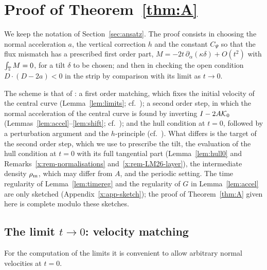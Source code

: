 \section{Proof of Theorem~\ref{thm:A}}\label{sec:proof}

We keep the notation of Section~\ref{sec:ansatz}. The proof consists in choosing the normal acceleration $a$, the vertical correction $h$ and the constant $C_\Psi$ so that the flux mismatch
has a prescribed first order part, $M=-2t\,\partial_\alpha(\kappa\delta)+O(t^2)$ with $\int_{\mathbb{T}} M=0$, for a tilt $\delta$ to be chosen; and then in checking the open condition $D\cdot(D-2a)<0$ in
the strip by comparison with its limit as $t\to0$.

The scheme is that of \cite[Secs.~5--7]{LM26}: a first order matching, which fixes the initial velocity of the central curve (Lemma~\ref{lem:limits}; cf.\ \cite[Lemmas~5.1--5.2]{LM26}); a second
order step, in which the normal acceleration of the central curve is found by inverting $I-2A\mathcal{K}_0$ (Lemmas~\ref{lem:accel}--\ref{lem:shift}; cf.\ \cite[Lemma~5.3 and Prop.~6.1]{LM26}); and
the hull condition at $t=0$, followed by a perturbation argument and the $h$-principle (cf.\ \cite[Sec.~7.4]{LM26}). What differs is the target of the second order step, which we use to prescribe
the tilt, the evaluation of the hull condition at $t=0$ with its full tangential part (Lemma~\ref{lem:hull0} and Remarks~\ref{x:rem-normalisations} and~\ref{x:rem-LM26-layer}), the
intermediate density $\rho_{\mathrm m}$, which may differ from $A$, and the periodic setting. The time regularity of Lemma~\ref{lem:timereg} and the regularity of $G$ in Lemma~\ref{lem:accel} are only sketched (Appendix~\ref{x:app-sketch}); the proof of Theorem~\ref{thm:A}
given here is complete modulo these sketches.

\subsection{The limit $t\to0$: velocity matching}
For the computation of the limits it is convenient to allow arbitrary normal velocities at $t=0$.

